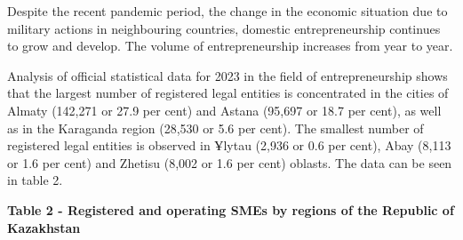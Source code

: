 \begin{multicols}{2}

Despite the recent pandemic period, the change in the economic situation
due to military actions in neighbouring countries, domestic
entrepreneurship continues to grow and develop. The volume of
entrepreneurship increases from year to year.

Analysis of official statistical data for 2023 in the field of
entrepreneurship shows that the largest number of registered legal
entities is concentrated in the cities of Almaty (142,271 or 27.9 per
cent) and Astana (95,697 or 18.7 per cent), as well as in the Karaganda
region (28,530 or 5.6 per cent). The smallest number of registered legal
entities is observed in Ұlytau (2,936 or 0.6 per cent), Abay (8,113 or
1.6 per cent) and Zhetisu (8,002 or 1.6 per cent) oblasts. The data can
be seen in table 2.
\end{multicols}

{\bfseries Table 2 - Registered and operating SMEs by regions of the
Republic of Kazakhstan}

